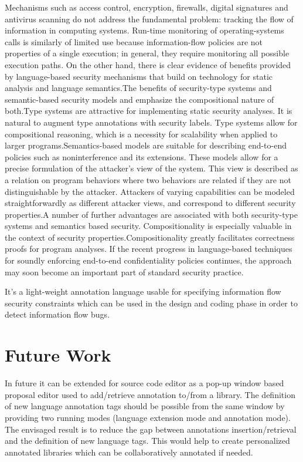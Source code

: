 Mechanisms such as access control, encryption, firewalls, digital
signatures and antivirus scanning do not address the fundamental
problem: tracking the flow of information in computing
systems. Run-time monitoring of operating-systems calls is
similarly of limited use because information-flow policies are
not properties of a single execution; in general, they require
monitoring all possible execution paths. On the other hand,
there is clear evidence of benefits provided by language-based
security mechanisms that build on technology for static analysis
and language semantics.The benefits of security-type systems and semantic-based security models and emphasize the compositional nature of both.Type systems are attractive for
implementing static security analyses. It is natural to augment
type annotations with security labels. Type systems allow for
compositional reasoning, which is a necessity for scalability
when applied to larger programs.Semantics-based models
are suitable for describing end-to-end policies such as
noninterference and its extensions. These models allow for a
precise formulation of the attacker's view of the system. This
view is described as a relation on program behaviors where
two behaviors are related if they are not distinguishable by
the attacker. Attackers of varying capabilities can be modeled
straightforwardly as different attacker views, and correspond
to different security properties.A number of further advantages are
associated with both security-type systems and semantics based
security. Compositionality is especially valuable in the
context of security properties.Compositionality
greatly facilitates correctness proofs for program analyses. If the recent
progress in language-based techniques for soundly enforcing
end-to-end confidentiality policies continues, the approach
may soon become an important part of standard security
practice.

It's a light-weight annotation language usable for specifying
information flow security constraints which can be used in the
design and coding phase in order to detect information flow
bugs.





\section{ Future Work}
In future it can be extended for source code editor as
a pop-up window based proposal editor used to add/retrieve
annotation to/from a library. The definition of new language
annotation tags should be possible from the same window by
providing two running modes (language extension mode and
annotation mode). The envisaged result is to reduce the gap
between annotations insertion/retrieval and the definition of
new language tags. This would help to create personalized
annotated libraries which can be collaboratively annotated if
needed.

